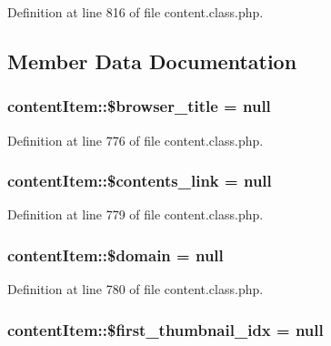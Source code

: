 Definition at line 816 of file content.\+class.\+php.



\subsection{Member Data Documentation}
\hypertarget{classcontentItem_abaf3b2f2d6878f8568161f4fce4e80bf}{
\subsubsection[{\$browser\+\_\+title}]{\setlength{\rightskip}{0pt plus 5cm}content\+Item\+::\$browser\+\_\+title = null}}\label{classcontentItem_abaf3b2f2d6878f8568161f4fce4e80bf}


Definition at line 776 of file content.\+class.\+php.

\hypertarget{classcontentItem_a6bf076b1d98025ee3f1d847fcf1fd29f}{
\subsubsection[{\$contents\+\_\+link}]{\setlength{\rightskip}{0pt plus 5cm}content\+Item\+::\$contents\+\_\+link = null}}\label{classcontentItem_a6bf076b1d98025ee3f1d847fcf1fd29f}


Definition at line 779 of file content.\+class.\+php.

\hypertarget{classcontentItem_a428d40bc2148eae5661822963ba819b4}{
\subsubsection[{\$domain}]{\setlength{\rightskip}{0pt plus 5cm}content\+Item\+::\$domain = null}}\label{classcontentItem_a428d40bc2148eae5661822963ba819b4}


Definition at line 780 of file content.\+class.\+php.

\hypertarget{classcontentItem_a3ed95afadefbe20bd085e1d88220f4b1}{
\subsubsection[{\$first\+\_\+thumbnail\+\_\+idx}]{\setlength{\rightskip}{0pt plus 5cm}content\+Item\+::\$first\+\_\+thumbnail\+\_\+idx = null}}\label{classcontentItem_a3ed95afadefbe20bd085e1d88220f4b1}


